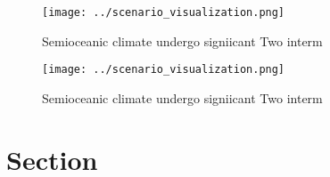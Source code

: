 \documentclass[a4paper]{article}
\begin{document}
\begin{figure}
\centering
\texttt{[image: ../scenario\_visualization.png]}
\caption{Semioceanic climate undergo signiicant Two interm
}
\end{figure}
 
\begin{figure}
\centering
\texttt{[image: ../scenario\_visualization.png]}
\caption{Semioceanic climate undergo signiicant Two interm
}
\end{figure}
 
\section{Section}
\end{document}
